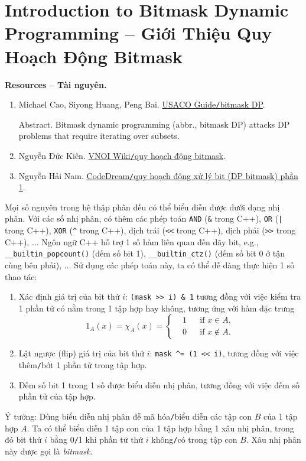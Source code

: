 \documentclass{article}
\begin{document}
\section{Introduction to Bitmask Dynamic Programming -- Giới Thiệu Quy Hoạch Động Bitmask}
\textbf{\textsf{Resources -- Tài nguyên.}}
\begin{enumerate}
    \item {\sc Michael Cao, Siyong Huang, Peng Bai}. \href{https://usaco.guide/gold/dp-bitmasks}{USACO Guide{\tt/}bitmask DP}.

    {\sf Abstract.} Bitmask dynamic programming (abbr., bitmask DP) attacks DP problems that require iterating over subsets.

    \item {\sc Nguyễn Đức Kiên}. \href{https://wiki.vnoi.info/algo/dp/dp-bitmask}{VNOI Wiki{\tt/}quy hoạch động bitmask}.

    \item {\sc Nguyễn Hải Nam}. \href{https://codedream.edu.vn/bitmask_1/}{CodeDream{\tt/}quy hoạch động xử lý bit (DP bitmask) phần 1}.
\end{enumerate}
Mọi số nguyên trong hệ thập phân đều có thể biểu diễn được dưới dạng nhị phân. Với các số nhị phân, có thêm các phép toán {\tt AND} (\verb|&| trong C++), {\tt OR} (\verb!|! trong C++), {\tt XOR} (\verb|^| trong C++), dịch trái (\verb|<<| trong C++), dịch phải (\verb|>>| trong C++), $\ldots$ Ngôn ngữ C++ hỗ trợ 1 số hàm liên quan đến dãy bit, e.g., \verb|__builtin_popcount()| (đếm số bit 1), \verb|__builtin_ctz()| (đếm số bit 0 ở tận cùng bên phải), $\ldots$ Sử dụng các phép toán này, ta có thể dễ dàng thực hiện 1 số thao tác:
\begin{enumerate}
    \item Xác định giá trị của bit thứ $i$: \verb|(mask >> i) & 1| tương đồng với việc kiểm tra 1 phần tử có nằm trong 1 tập hợp hay không, tương ứng với hàm đặc trưng
    \begin{equation*}
        1_A(x) = \chi_A(x) = \left\{\begin{split}
            &1&&\mbox{if } x\in A,\\
            &0&&\mbox{if } x\notin A.
        \end{split}\right.
    \end{equation*}
    \item Lật ngược (flip) giá trị của bit thứ $i$: \verb|mask ^= (1 << i)|, tương đồng với việc thêm{\tt/}bớt 1 phần tử trong tập hợp.
    \item Đếm số bit 1 trong 1 số được biểu diễn nhị phân, tương đồng với việc đếm số phần tử của tập hợp.
\end{enumerate}
{\sf Ý tưởng}: Dùng biểu diễn nhị phân đễ mã hóa{\tt/}biểu diễn các tập con $B$ của 1 tập hợp $A$. Ta có thể biểu diễn 1 tập con của 1 tập hợp bằng 1 xâu nhị phân, trong đó bit thứ $i$ bằng 0{\tt/}1 khi phần tử thứ $i$ không{\tt/}có trong tập con $B$. Xâu nhị phân này được gọi là {\it bitmask}.
\end{document}
